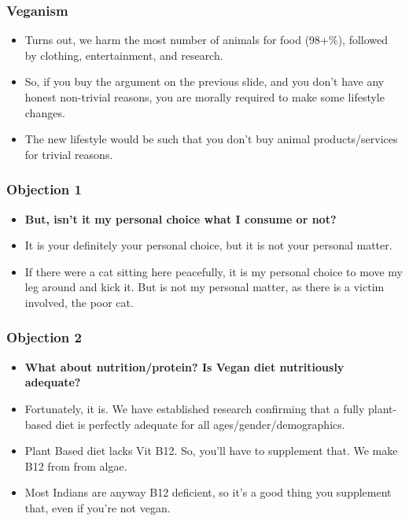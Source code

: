 \documentclass[aspectratio=43]{beamer}
\begin{document}
\begin{frame}
    \frametitle{Veganism}
    \begin{itemize}
        \item Turns out, we harm the most number of animals for food (98+\%), followed by clothing, entertainment, and research.
        \item So, if you buy the argument on the previous slide, and you don't have any honest non-trivial reasons, you are morally required to make some lifestyle changes.
        \item The new lifestyle would be such that you don't buy animal products/services for trivial reasons.
    \end{itemize}
\end{frame}

\begin{frame}
    \frametitle{Objection 1}
    \begin{itemize}
        \item \textbf{But, isn't it my personal choice what I consume or not?}
        \item It is your definitely your personal choice, but it is not your personal matter.
        \item If there were a cat sitting here peacefully, it is my personal choice to move my leg around and kick it. But is not my personal matter, as there is a victim involved, the poor cat.
    \end{itemize}
\end{frame}

\begin{frame}
    \frametitle{Objection 2}
    \begin{itemize}
        \item \textbf{What about nutrition/protein? Is Vegan diet nutritiously adequate?}
        \item Fortunately, it is. We have established research confirming that a fully plant-based diet is perfectly adequate for all ages/gender/demographics.
        \item Plant Based diet lacks Vit B12. So, you'll have to supplement that. We make B12 from from algae.
        \item Most Indians are anyway B12 deficient, so it's a good thing you supplement that, even if you're not vegan.
    \end{itemize}
\end{frame}
\end{document}
